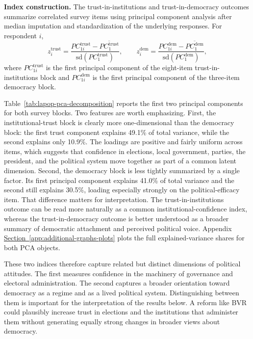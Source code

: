 \textbf{Index construction.} The trust-in-institutions and trust-in-democracy outcomes summarize correlated survey items using principal component analysis after median imputation and standardization of the underlying responses. For respondent $i$,
\begin{equation}
\label{eq:lapop-pca}
z^{\text{trust}}_i = \frac{PC^{\text{trust}}_{1i} - \overline{PC^{\text{trust}}_{1}}}{\mathrm{sd}(PC^{\text{trust}}_{1})},
\qquad
z^{\text{dem}}_i = \frac{PC^{\text{dem}}_{1i} - \overline{PC^{\text{dem}}_{1}}}{\mathrm{sd}(PC^{\text{dem}}_{1})},
\end{equation}
where $PC^{\text{trust}}_{1i}$ is the first principal component of the eight-item trust-in-institutions block and $PC^{\text{dem}}_{1i}$ is the first principal component of the three-item democracy block.

\begin{table}[htbp]
    \caption{PCA Decomposition of the Trust and Democracy Indices}
    \label{tab:lapop-pca-decomposition}
    \centering
\end{table}

Table~\ref{tab:lapop-pca-decomposition} reports the first two principal components for both survey blocks. Two features are worth emphasizing. First, the institutional-trust block is clearly more one-dimensional than the democracy block: the first trust component explains 49.1\% of total variance, while the second explains only 10.9\%. The loadings are positive and fairly uniform across items, which suggests that confidence in elections, local government, parties, the president, and the political system move together as part of a common latent dimension. Second, the democracy block is less tightly summarized by a single factor. Its first principal component explains 41.0\% of total variance and the second still explains 30.5\%, loading especially strongly on the political-efficacy item. That difference matters for interpretation. The trust-in-institutions outcome can be read more naturally as a common institutional-confidence index, whereas the trust-in-democracy outcome is better understood as a broader summary of democratic attachment and perceived political voice. Appendix \hyperref[app:additional-graphs-plots]{Section~\ref*{app:additional-graphs-plots}} plots the full explained-variance shares for both PCA objects.

These two indices therefore capture related but distinct dimensions of political attitudes. The first measures confidence in the machinery of governance and electoral administration. The second captures a broader orientation toward democracy as a regime and as a lived political system. Distinguishing between them is important for the interpretation of the results below. A reform like BVR could plausibly increase trust in elections and the institutions that administer them without generating equally strong changes in broader views about democracy.

